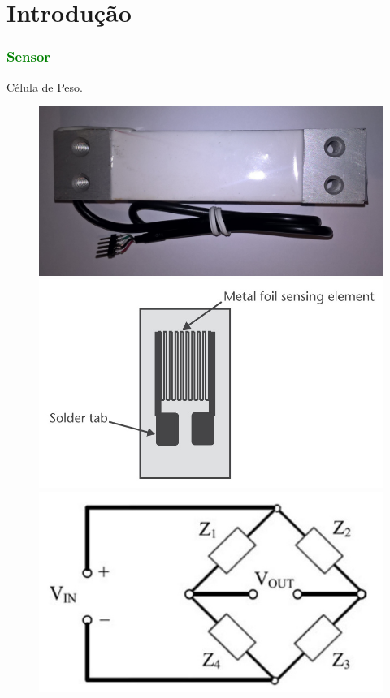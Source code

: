 \section{Introdução}
\begin{frame}
\frametitle{\textcolor{green}{Sensor}}
Célula de Peso.
\begin{figure}[!b]
	\includegraphics[scale=0.08]{./image/PESTA/material/Load_Cell_1.jpg}
	\hspace{.1cm}
	\includegraphics[scale=.1]{./image/PESTA/general/strain_gauge_1.jpg}
	\hspace{.1cm}
	\includegraphics[scale=.3]{./image/PESTA/schematic/Wheatstone_Bridge_1.jpg}

\end{figure}
\end{frame}
